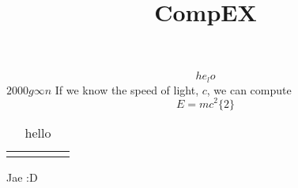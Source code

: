 \documentclass[12pt]{article}
\begin{document}
\title{CompEX}
\maketitle
\[
    he_{l} o
\]
\(2000 g\infty n\) 
If we know the speed of light, \(c\), we can compute 
\[
    E = mc^2\{ 2\} 
\] 
    \begin{table}[H]
        \centering
        \begin{tabular}{c|c|c|c|c}
            \toprule
                &  &  &  &   \\
            \midrule
                &  &  &  &   \\
            \bottomrule
        \end{tabular}
        \caption{hello}
        \label{tab:label}
    \end{table}
    Jae :D
\end{document}
